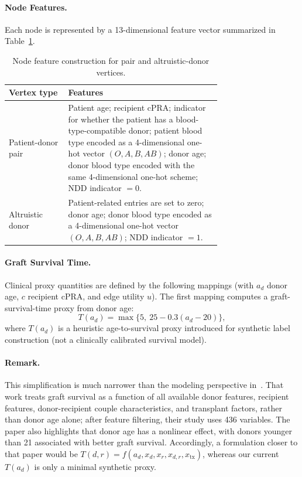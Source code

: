 \documentclass{article}
\begin{document}
\paragraph{Node Features.}
Each node is represented by a 13-dimensional feature vector summarized in Table~\ref{tab:node-features}.

\begin{table}[H]
\centering
\caption{Node feature construction for pair and altruistic-donor vertices.}
\label{tab:node-features}
\begin{tabular}{@{}lp{0.72\linewidth}@{}}
\toprule
\textbf{Vertex type} & \textbf{Features} \\
\midrule
Patient-donor pair & Patient age; recipient cPRA; indicator for whether the patient has a blood-type-compatible donor; patient blood type encoded as a 4-dimensional one-hot vector $(O,A,B,AB)$; donor age; donor blood type encoded with the same 4-dimensional one-hot scheme; NDD indicator $=0$. \\
Altruistic donor & Patient-related entries are set to zero; donor age; donor blood type encoded as a 4-dimensional one-hot vector $(O,A,B,AB)$; NDD indicator $=1$. \\
\bottomrule
\end{tabular}
\end{table}
\paragraph{Graft Survival Time.}
Clinical proxy quantities are defined by the following mappings (with $a_d$ donor age, $c$ recipient cPRA, and edge utility $u$).
The first mapping computes a graft-survival-time proxy from donor age:
\[
T(a_d)=\max\{5,\ 25-0.3(a_d-20)\},
\]
where \(T(a_d)\) is a heuristic age-to-survival proxy introduced for synthetic label construction (not a clinically calibrated survival model).
\paragraph{Remark.}
This simplification is much narrower than the modeling perspective in~\citet{luck2017deep}. That work treats graft survival as a function of all available donor features, recipient features, donor-recipient couple characteristics, and transplant factors, rather than donor age alone; after feature filtering, their study uses 436 variables. The paper also highlights that donor age has a nonlinear effect, with donors younger than 21 associated with better graft survival. Accordingly, a formulation closer to that paper would be \(T(d,r)=f(a_d,x_d,x_r,x_{d,r},x_{\mathrm{tx}})\), whereas our current \(T(a_d)\) is only a minimal synthetic proxy.
\end{document}
